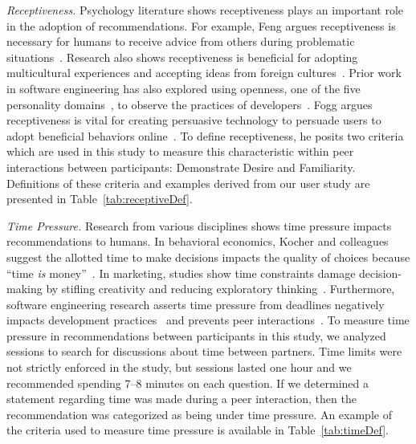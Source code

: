 \textit{Receptiveness.} Psychology literature shows receptiveness plays an important role in the adoption of recommendations. For example, Feng argues receptiveness is necessary for humans to receive advice from others during problematic situations~\cite{feng2006receptiveness}. Research also shows receptiveness is beneficial for adopting multicultural experiences and accepting ideas from foreign cultures~\cite{leung2010multicultural}. Prior work in software engineering has also explored using openness, one of the five personality domains~\cite{digman1990personality}, to observe the practices of developers~\cite{smith2016beliefs}. Fogg argues receptiveness is vital for creating persuasive technology to persuade users to adopt beneficial behaviors online~\cite{Fogg2009Persuasive}. To define receptiveness, he posits two criteria which are used in this study to measure this characteristic within peer interactions between participants: Demonstrate Desire and Familiarity. Definitions of these criteria and examples derived from our user study are presented in Table~\ref{tab:receptiveDef}.

\textit{Time Pressure.} Research from various disciplines shows time pressure impacts recommendations to humans. In behavioral economics, Kocher and colleagues suggest the allotted time to make decisions impacts the quality of choices because ``time \textit{is} money''~\cite{kocher2006time}. In marketing, studies show time constraints damage decision-making by stifling creativity and reducing exploratory thinking~\cite{AndrewsTimePressure}. Furthermore, software engineering research asserts time pressure from deadlines negatively impacts development practices~\cite{CostelloDeadline84} and prevents peer interactions~\cite{Murphy-Hill2015HowDoUsers}. To measure time pressure in recommendations between participants in this study, we analyzed sessions to search for discussions about time between partners. Time limits were not strictly enforced in the study, but sessions lasted one hour and we recommended spending 7–8 minutes on each question. If we determined a statement regarding time was made during a peer interaction, then the recommendation was categorized as being under time pressure. An example of the criteria used to measure time pressure is available in Table~\ref{tab:timeDef}.

